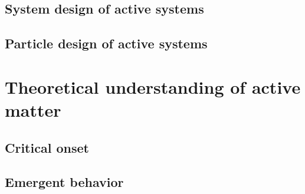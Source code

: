 %
%
%


\subsection{System design of active systems}


\subsection{Particle design of active systems}

\section{Theoretical understanding of active matter}

\subsection{Critical onset}

\subsection{Emergent behavior}
